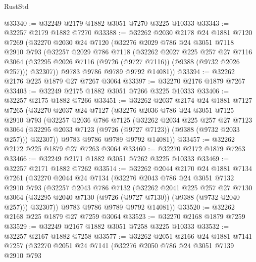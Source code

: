 \begin{lexlean}{RustStd}
\begin{coremodule}
@33340 := @32249 @2179 @1882 @3051 @7270 @3225 @10333
@33343 := @32257 @2179 @1882 @7270
@33388 := @32262
    @2030
    @2178
    @24
    @1881
    @7120
    @7269
    (@32270
      @2030
      @24
      @7120
      (@32276
        @2029
        @786
        @24
        @3051
        @7118
        @2910
        @793
        (@32257
          @2029
          @786
          @7118
          (@32262
            @2027
            @225
            @257
            @27
            @7116
            @3064
            (@32295 @2026 @7116 (@9726 (@9727 @7116)) (@9388 (@9732 @2026 @257)))
            @32307))
        @9783
        @9786
        @9789
        @9792
        @14081))
@33394 := @32262 @2176 @225 @1879 @27 @7267 @3064
@33397 := @32270 @2176 @1879 @7267
@33403 := @32249 @2175 @1882 @3051 @7266 @3225 @10333
@33406 := @32257 @2175 @1882 @7266
@33451 := @32262
    @2037
    @2174
    @24
    @1881
    @7127
    @7265
    (@32270
      @2037
      @24
      @7127
      (@32276
        @2036
        @786
        @24
        @3051
        @7125
        @2910
        @793
        (@32257
          @2036
          @786
          @7125
          (@32262
            @2034
            @225
            @257
            @27
            @7123
            @3064
            (@32295 @2033 @7123 (@9726 (@9727 @7123)) (@9388 (@9732 @2033 @257)))
            @32307))
        @9783
        @9786
        @9789
        @9792
        @14081))
@33457 := @32262 @2172 @225 @1879 @27 @7263 @3064
@33460 := @32270 @2172 @1879 @7263
@33466 := @32249 @2171 @1882 @3051 @7262 @3225 @10333
@33469 := @32257 @2171 @1882 @7262
@33514 := @32262
    @2044
    @2170
    @24
    @1881
    @7134
    @7261
    (@32270
      @2044
      @24
      @7134
      (@32276
        @2043
        @786
        @24
        @3051
        @7132
        @2910
        @793
        (@32257
          @2043
          @786
          @7132
          (@32262
            @2041
            @225
            @257
            @27
            @7130
            @3064
            (@32295 @2040 @7130 (@9726 (@9727 @7130)) (@9388 (@9732 @2040 @257)))
            @32307))
        @9783
        @9786
        @9789
        @9792
        @14081))
@33520 := @32262 @2168 @225 @1879 @27 @7259 @3064
@33523 := @32270 @2168 @1879 @7259
@33529 := @32249 @2167 @1882 @3051 @7258 @3225 @10333
@33532 := @32257 @2167 @1882 @7258
@33577 := @32262
    @2051
    @2166
    @24
    @1881
    @7141
    @7257
    (@32270
      @2051
      @24
      @7141
      (@32276
        @2050
        @786
        @24
        @3051
        @7139
        @2910
        @793

\end{coremodule}
\end{lexlean}
